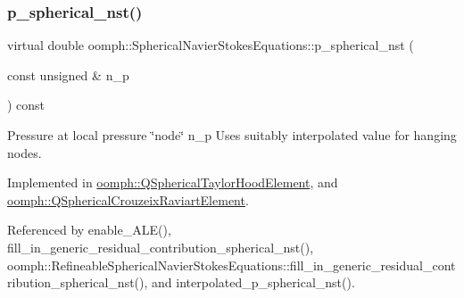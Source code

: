 \mbox{\label{classoomph_1_1SphericalNavierStokesEquations_a5b50d547e5a2ad5896dc9612e2bb4176}} 
\subsubsection{\texorpdfstring{p\+\_\+spherical\+\_\+nst()}{p\_spherical\_nst()}}
{\footnotesize\ttfamily virtual double oomph\+::\+Spherical\+Navier\+Stokes\+Equations\+::p\+\_\+spherical\+\_\+nst (\begin{DoxyParamCaption}\item[{const unsigned \&}]{n\+\_\+p }\end{DoxyParamCaption}) const\hspace{0.3cm}{\ttfamily [pure virtual]}}



Pressure at local pressure \char`\"{}node\char`\"{} n\+\_\+p Uses suitably interpolated value for hanging nodes. 



Implemented in \hyperlink{classoomph_1_1QSphericalTaylorHoodElement_a0baaa4667b08a35ccb6f655fc55e63ac}{oomph\+::\+Q\+Spherical\+Taylor\+Hood\+Element}, and \hyperlink{classoomph_1_1QSphericalCrouzeixRaviartElement_a793d90652542ffffade39aaf25f9cc4c}{oomph\+::\+Q\+Spherical\+Crouzeix\+Raviart\+Element}.



Referenced by enable\+\_\+\+A\+L\+E(), fill\+\_\+in\+\_\+generic\+\_\+residual\+\_\+contribution\+\_\+spherical\+\_\+nst(), oomph\+::\+Refineable\+Spherical\+Navier\+Stokes\+Equations\+::fill\+\_\+in\+\_\+generic\+\_\+residual\+\_\+contribution\+\_\+spherical\+\_\+nst(), and interpolated\+\_\+p\+\_\+spherical\+\_\+nst().

\mbox{\label{classoomph_1_1SphericalNavierStokesEquations_a1776fe3c26e4ee175a0c71a2db66a78d}} 
